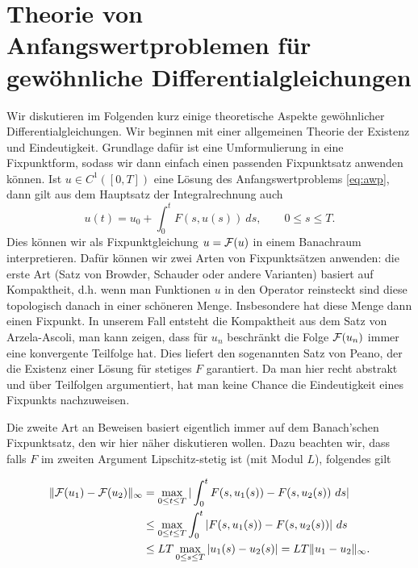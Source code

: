 \section{Theorie von Anfangswertproblemen für gewöhnliche Differentialgleichungen}

Wir diskutieren im Folgenden kurz einige theoretische Aspekte gewöhnlicher Differentialgleichungen. Wir beginnen mit einer allgemeinen Theorie der Existenz und Eindeutigkeit. Grundlage dafür ist eine Umformulierung in eine Fixpunktform, sodass wir dann einfach einen passenden Fixpunktsatz anwenden können. Ist $u \in C^1([0,T])$ eine Lösung des Anfangswertproblems \eqref{eq:awp}, dann gilt aus dem Hauptsatz der Integralrechnung auch
$$ u(t) = u_0 + \int_0^t F(s,u(s)) ~ds , \qquad 0 \leq s \leq T. $$
Dies können wir als Fixpunktgleichung $u= {\cal F}(u)$  in einem Banachraum interpretieren. Dafür können wir zwei Arten von Fixpunktsätzen anwenden: die erste Art (Satz von Browder, Schauder oder andere Varianten) basiert auf Kompaktheit, d.h. wenn man Funktionen $u$ in den Operator reinsteckt sind diese topologisch danach in einer schöneren Menge. Insbesondere hat diese Menge dann einen Fixpunkt. In unserem Fall entsteht die Kompaktheit aus dem Satz von Arzela-Ascoli, man kann zeigen, dass für $u_n$ beschränkt die Folge ${\cal F}(u_n)$ immer eine konvergente Teilfolge hat. Dies liefert den sogenannten Satz von Peano, der die Existenz einer Lösung für stetiges $F$ garantiert. Da man hier recht abstrakt und über Teilfolgen argumentiert, hat man keine Chance die Eindeutigkeit eines Fixpunkts nachzuweisen. 

Die zweite Art an Beweisen basiert eigentlich immer auf dem Banach'schen Fixpunktsatz, den wir hier näher diskutieren wollen. Dazu beachten wir, dass falls $F$ im zweiten Argument Lipschitz-stetig ist (mit Modul $L$), folgendes gilt 

\begin{align*} 
\Vert {\cal F}(u_1) - {\cal F}(u_2) \Vert_\infty &= \max_{0 \leq t \leq T} \vert \int_0^t F(s,u_1(s)) - F(s,u_2(s)) ~ds \vert \\
&\leq  \max_{0 \leq t \leq T} \int_0^t \vert  F(s,u_1(s)) - F(s,u_2(s))\vert  ~ds  \\ &\leq  L T  \max_{0 \leq s \leq T} \vert u_1(s) - u_2(s) \vert = L T \Vert u_1 - u_2 \Vert_\infty. 
\end{align*}

